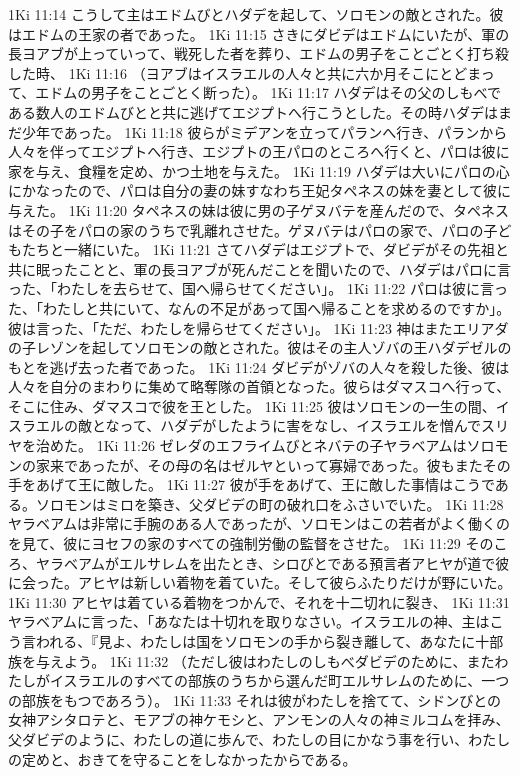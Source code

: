 1Ki 11:14  こうして主はエドムびとハダデを起して、ソロモンの敵とされた。彼はエドムの王家の者であった。
1Ki 11:15  さきにダビデはエドムにいたが、軍の長ヨアブが上っていって、戦死した者を葬り、エドムの男子をことごとく打ち殺した時、
1Ki 11:16  （ヨアブはイスラエルの人々と共に六か月そこにとどまって、エドムの男子をことごとく断った）。
1Ki 11:17  ハダデはその父のしもべである数人のエドムびとと共に逃げてエジプトへ行こうとした。その時ハダデはまだ少年であった。
1Ki 11:18  彼らがミデアンを立ってパランへ行き、パランから人々を伴ってエジプトへ行き、エジプトの王パロのところへ行くと、パロは彼に家を与え、食糧を定め、かつ土地を与えた。
1Ki 11:19  ハダデは大いにパロの心にかなったので、パロは自分の妻の妹すなわち王妃タペネスの妹を妻として彼に与えた。
1Ki 11:20  タペネスの妹は彼に男の子ゲヌバテを産んだので、タペネスはその子をパロの家のうちで乳離れさせた。ゲヌバテはパロの家で、パロの子どもたちと一緒にいた。
1Ki 11:21  さてハダデはエジプトで、ダビデがその先祖と共に眠ったことと、軍の長ヨアブが死んだことを聞いたので、ハダデはパロに言った、「わたしを去らせて、国へ帰らせてください」。
1Ki 11:22  パロは彼に言った、「わたしと共にいて、なんの不足があって国へ帰ることを求めるのですか」。彼は言った、「ただ、わたしを帰らせてください」。
1Ki 11:23  神はまたエリアダの子レゾンを起してソロモンの敵とされた。彼はその主人ゾバの王ハダデゼルのもとを逃げ去った者であった。
1Ki 11:24  ダビデがゾバの人々を殺した後、彼は人々を自分のまわりに集めて略奪隊の首領となった。彼らはダマスコへ行って、そこに住み、ダマスコで彼を王とした。
1Ki 11:25  彼はソロモンの一生の間、イスラエルの敵となって、ハダデがしたように害をなし、イスラエルを憎んでスリヤを治めた。
1Ki 11:26  ゼレダのエフライムびとネバテの子ヤラベアムはソロモンの家来であったが、その母の名はゼルヤといって寡婦であった。彼もまたその手をあげて王に敵した。
1Ki 11:27  彼が手をあげて、王に敵した事情はこうである。ソロモンはミロを築き、父ダビデの町の破れ口をふさいでいた。
1Ki 11:28  ヤラベアムは非常に手腕のある人であったが、ソロモンはこの若者がよく働くのを見て、彼にヨセフの家のすべての強制労働の監督をさせた。
1Ki 11:29  そのころ、ヤラベアムがエルサレムを出たとき、シロびとである預言者アヒヤが道で彼に会った。アヒヤは新しい着物を着ていた。そして彼らふたりだけが野にいた。
1Ki 11:30  アヒヤは着ている着物をつかんで、それを十二切れに裂き、
1Ki 11:31  ヤラベアムに言った、「あなたは十切れを取りなさい。イスラエルの神、主はこう言われる、『見よ、わたしは国をソロモンの手から裂き離して、あなたに十部族を与えよう。
1Ki 11:32  （ただし彼はわたしのしもべダビデのために、またわたしがイスラエルのすべての部族のうちから選んだ町エルサレムのために、一つの部族をもつであろう）。
1Ki 11:33  それは彼がわたしを捨てて、シドンびとの女神アシタロテと、モアブの神ケモシと、アンモンの人々の神ミルコムを拝み、父ダビデのように、わたしの道に歩んで、わたしの目にかなう事を行い、わたしの定めと、おきてを守ることをしなかったからである。
